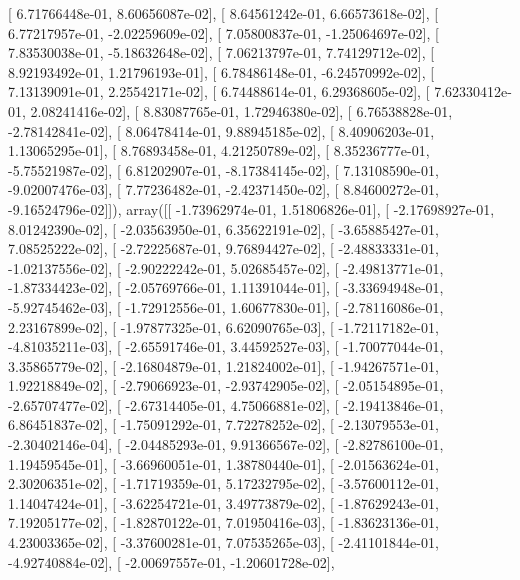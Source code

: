 \documentclass{article}
\begin{document}
       [  6.71766448e-01,   8.60656087e-02],
       [  8.64561242e-01,   6.66573618e-02],
       [  6.77217957e-01,  -2.02259609e-02],
       [  7.05800837e-01,  -1.25064697e-02],
       [  7.83530038e-01,  -5.18632648e-02],
       [  7.06213797e-01,   7.74129712e-02],
       [  8.92193492e-01,   1.21796193e-01],
       [  6.78486148e-01,  -6.24570992e-02],
       [  7.13139091e-01,   2.25542171e-02],
       [  6.74488614e-01,   6.29368605e-02],
       [  7.62330412e-01,   2.08241416e-02],
       [  8.83087765e-01,   1.72946380e-02],
       [  6.76538828e-01,  -2.78142841e-02],
       [  8.06478414e-01,   9.88945185e-02],
       [  8.40906203e-01,   1.13065295e-01],
       [  8.76893458e-01,   4.21250789e-02],
       [  8.35236777e-01,  -5.75521987e-02],
       [  6.81202907e-01,  -8.17384145e-02],
       [  7.13108590e-01,  -9.02007476e-03],
       [  7.77236482e-01,  -2.42371450e-02],
       [  8.84600272e-01,  -9.16524796e-02]]), array([[ -1.73962974e-01,   1.51806826e-01],
       [ -2.17698927e-01,   8.01242390e-02],
       [ -2.03563950e-01,   6.35622191e-02],
       [ -3.65885427e-01,   7.08525222e-02],
       [ -2.72225687e-01,   9.76894427e-02],
       [ -2.48833331e-01,  -1.02137556e-02],
       [ -2.90222242e-01,   5.02685457e-02],
       [ -2.49813771e-01,  -1.87334423e-02],
       [ -2.05769766e-01,   1.11391044e-01],
       [ -3.33694948e-01,  -5.92745462e-03],
       [ -1.72912556e-01,   1.60677830e-01],
       [ -2.78116086e-01,   2.23167899e-02],
       [ -1.97877325e-01,   6.62090765e-03],
       [ -1.72117182e-01,  -4.81035211e-03],
       [ -2.65591746e-01,   3.44592527e-03],
       [ -1.70077044e-01,   3.35865779e-02],
       [ -2.16804879e-01,   1.21824002e-01],
       [ -1.94267571e-01,   1.92218849e-02],
       [ -2.79066923e-01,  -2.93742905e-02],
       [ -2.05154895e-01,  -2.65707477e-02],
       [ -2.67314405e-01,   4.75066881e-02],
       [ -2.19413846e-01,   6.86451837e-02],
       [ -1.75091292e-01,   7.72278252e-02],
       [ -2.13079553e-01,  -2.30402146e-04],
       [ -2.04485293e-01,   9.91366567e-02],
       [ -2.82786100e-01,   1.19459545e-01],
       [ -3.66960051e-01,   1.38780440e-01],
       [ -2.01563624e-01,   2.30206351e-02],
       [ -1.71719359e-01,   5.17232795e-02],
       [ -3.57600112e-01,   1.14047424e-01],
       [ -3.62254721e-01,   3.49773879e-02],
       [ -1.87629243e-01,   7.19205177e-02],
       [ -1.82870122e-01,   7.01950416e-03],
       [ -1.83623136e-01,   4.23003365e-02],
       [ -3.37600281e-01,   7.07535265e-03],
       [ -2.41101844e-01,  -4.92740884e-02],
       [ -2.00697557e-01,  -1.20601728e-02],
\end{document}
